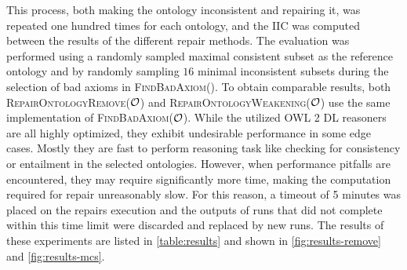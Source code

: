 This process, both making the ontology inconsistent and repairing it, was repeated one hundred times for each ontology, and the IIC was computed between the results of the different repair methods. The evaluation was performed using a randomly sampled maximal consistent subset as the reference ontology and by randomly sampling $16$ minimal inconsistent subsets during the selection of bad axioms in \textsc{FindBadAxiom}(\Omc). To obtain comparable results, both \textsc{RepairOntologyRemove}($\mathcal{O}$) and \textsc{RepairOntologyWeakening}($\mathcal{O}$) use the same implementation of \textsc{FindBadAxiom}($\mathcal{O}$). While the utilized OWL 2 DL reasoners are all highly optimized, they exhibit undesirable performance in some edge cases. Mostly they are fast to perform reasoning task like checking for consistency or entailment in the selected ontologies. However, when performance pitfalls are encountered, they may require significantly more time, making the computation required for repair unreasonably slow. For this reason, a timeout of 5 minutes was placed on the repairs execution and the outputs of runs that did not complete within this time limit were discarded and replaced by new runs. The results of these experiments are listed in \cref{table:results} and shown in \cref{fig:results-remove} and \cref{fig:results-mcs}.

